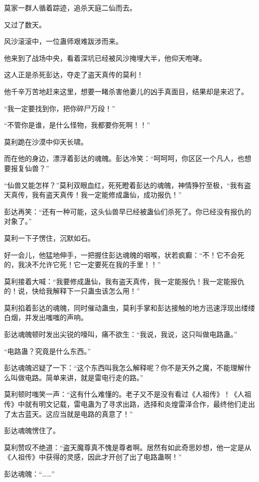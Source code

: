 \begin{this_body}
莫家一群人循着踪迹，追杀天庭二仙而去。

又过了数天。

风沙滚滚中，一位蛊师艰难跋涉而来。

他来到了战场中央，看着深坑已经被风沙掩埋大半，他仰天咆哮。

这人正是杀死彭达，夺走了盗天真传的莫利！

他千辛万苦地赶来这里，想要一睹杀害他妻儿的凶手真面目，结果却是来迟了。

“我一定要找到你，把你碎尸万段！”

“不管你是谁，是什么怪物，我都要你死啊！！”

莫利跪在沙漠中仰天长啸。

而在他的身边，漂浮着彭达的魂魄。彭达冷笑：“呵呵呵，你区区一个凡人，也想要报复仙兽？”

“仙兽又能怎样？”莫利双眼血红，死死瞪着彭达的魂魄，神情狰狞至极，“我有盗天真传，我有盗天真传！我一定能修成蛊仙，成功报仇！”

彭达再笑：“还有一种可能，这头仙兽早已经被蛊仙们杀死了。你已经没有报仇的对象了。”

莫利一下子愣住，沉默如石。

好一会儿，他猛地伸手，一把握住彭达魂魄的咽喉，状若疯癫：“不！它不会死的，我决不允许它死！它一定要死在我的手里！！”

莫利接着大喊：“我要修成蛊仙，我有盗天真传，我一定能报仇！我一定能报仇的！说，快给我解释下一只蛊虫该怎么用！”

莫利掐着彭达的魂魄，同时催动蛊虫，莫利手掌和彭达接触的地方迅速浮现出缕缕白烟，并发出嗤嗤的声响。

彭达魂魄顿时发出尖锐的嚎叫，痛不欲生：“我说，我说，这只叫做电路蛊。”

“电路蛊？究竟是什么东西。”

彭达魂魄迟疑了一下：“这个东西叫我怎么解释呢？你不是天外之魔，不能理解什么叫做电路。简单来讲，就是雷电行走的路。”

莫利顿时嗤笑一声：“这有什么难懂的。老子又不是没有看过《人祖传》！《人祖传》中就有明文记载，雷电蛊为了寻求出路，选择和炎煌雷泽合作，最终他们走出了太古蓝天。这应当就是电路的真意了！”

彭达魂魄愣住了。

莫利赞叹不绝道：“盗天魔尊真不愧是尊者啊。居然有如此奇思妙想，他一定是从《人祖传》中获得的灵感，因此才开创了出了电路蛊啊！”

彭达魂魄：“……”

\end{this_body}

